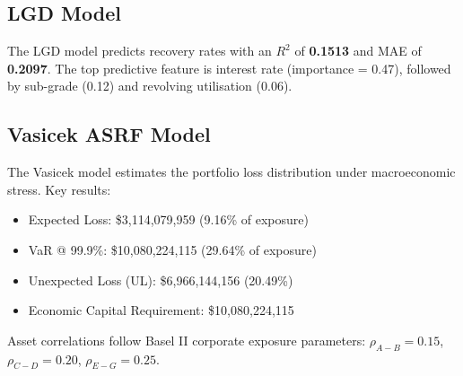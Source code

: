 \documentclass[11pt, a4paper]{article}
\begin{document}
\subsection{LGD Model}

The LGD model predicts recovery rates with an $R^{2}$ of \textbf{0.1513} and MAE of
\textbf{0.2097}.  The top predictive feature is interest rate (importance = 0.47), followed
by sub-grade (0.12) and revolving utilisation (0.06).

\subsection{Vasicek ASRF Model}

The Vasicek model estimates the portfolio loss distribution under macroeconomic stress.
Key results:

\begin{itemize}
    \item Expected Loss: \$3,114,079,959 (9.16\% of exposure)
    \item VaR @ 99.9\%: \$10,080,224,115 (29.64\% of exposure)
    \item Unexpected Loss (UL): \$6,966,144,156 (20.49\%)
    \item Economic Capital Requirement: \$10,080,224,115
\end{itemize}

Asset correlations follow Basel II corporate exposure parameters:
$\rho_{A-B} = 0.15$, $\rho_{C-D} = 0.20$, $\rho_{E-G} = 0.25$.

\end{document}
